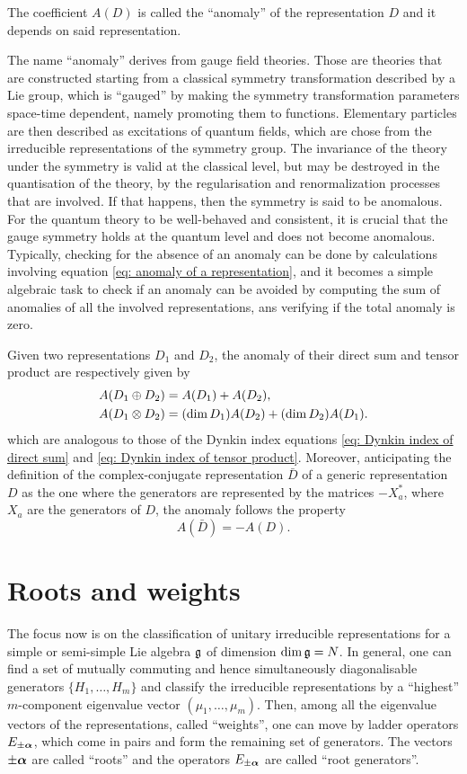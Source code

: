 The coefficient $A(D)$ is called the ``anomaly'' of the representation $D$ and it depends on said representation. 
\begin{obs}
    The name ``anomaly'' derives from gauge field theories. Those are theories that are constructed starting from a classical symmetry transformation described by a Lie group, which is ``gauged'' by making the symmetry transformation parameters space-time dependent, namely promoting them to functions. Elementary particles are then described as excitations of quantum fields, which are chose from the irreducible representations of the symmetry group. The invariance of the theory under the symmetry is valid at the classical level, but may be destroyed in the quantisation of the theory, by the regularisation and renormalization processes that are involved. If that happens, then the symmetry is said to be anomalous. For the quantum theory to be well-behaved and consistent, it is crucial that the gauge symmetry holds at the quantum level and does not become anomalous. Typically, checking for the absence of an anomaly can be done by calculations involving equation \eqref{eq: anomaly of a representation}, and it becomes a simple algebraic task to check if an anomaly can be avoided by computing the sum of anomalies of all the involved representations, ans verifying if the total anomaly is zero.  
\end{obs}
Given two representations $D_1$ and $D_2$, the anomaly of their direct sum and tensor product are respectively given by
\begin{align}
    A(D_1 \oplus D_2) &= A(D_1) + A(D_2), \\
    A(D_1 \otimes D_2) &= (\dim{D_1})A(D_2) + (\dim{D_2})A(D_1). 
\end{align}
which are analogous to those of the Dynkin index equations \eqref{eq: Dynkin index of direct sum} and \eqref{eq: Dynkin index of tensor product}. Moreover, anticipating the definition of the complex-conjugate representation $\bar{D}$ of a generic representation $D$ as the one where the generators are represented by the matrices $-X_a^*$, where $X_a$ are the generators of $D$, the anomaly follows the property
\begin{equation}
    A(\bar{D}) = -A(D).
\end{equation}

\section{Roots and weights}
The focus now is on the classification of unitary irreducible representations for a simple or semi-simple Lie algebra $\mathfrak{g}$ of dimension $\dim{\mathfrak{g}} = N$. In general, one can find a set of mutually commuting and hence simultaneously diagonalisable generators $\{H_1,\dots,H_m\}$ and classify the irreducible representations by a ``highest'' $m$-component eigenvalue vector $(\mu_1,\dots,\mu_m)$. Then, among all the eigenvalue vectors of the representations, called ``weights'', one can move by ladder operators $E_{\pm\bm{\alpha}}$, which come in pairs and form the remaining set of generators. The vectors $\pm\bm{\alpha}$ are called ``roots'' and the operators $E_{\pm\bm{\alpha}}$ are called ``root generators''. 

